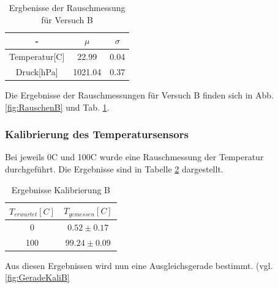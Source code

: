 \documentclass[12pt,a4paper]{article}
\begin{document}
\begin{table}
\begin{center}
\begin{tabular}{|c|c|c|}
\hline 
- & $\mu$ & $\sigma$\\ 
\hline 
Temperatur[C] & 22.99 & 0.04 \\ 
\hline 
Druck[hPa] & 1021.04 & 0.37\\ 
\hline 
\end{tabular}
\caption[Tabelle Rauschenmessung B]{Ergbenisse der Rauschmessung für Versuch B}
\label{tab:RauschenB}
\end{center}
\end{table}

Die Ergebnisse der Rauschmessungen für Versuch B finden sich in Abb. \ref{fig:RauschenB} und Tab. \ref{tab:RauschenB}.



\subsubsection{Kalibrierung des Temperatursensors}
Bei jeweils 0C und 100C wurde eine Rauschmessung der Temperatur durchgeführt. Die Ergebnisse sind in Tabelle \ref{tab:KaliB} dargestellt.

\begin{table}
\begin{center}
\begin{tabular}{|c|c|}
\hline 
$T_{erwartet}[C]$ & $T_{gemessen}[C]$ \\ 
\hline 
0 & $0.52 \pm 0.17$ \\ 
\hline 
100 & $99.24\pm 0.09$ \\ 
\hline 
\end{tabular}
\caption[Ergebnisse Kalibrierung B]{Ergebnisse Kalibrierung B}
\label{tab:KaliB}
\end{center}
\end{table}

Aus diesen Ergebnissen wird nun eine Ausgleichsgerade bestimmt. (vgl. \ref{fig:GeradeKaliB}
\end{document}
